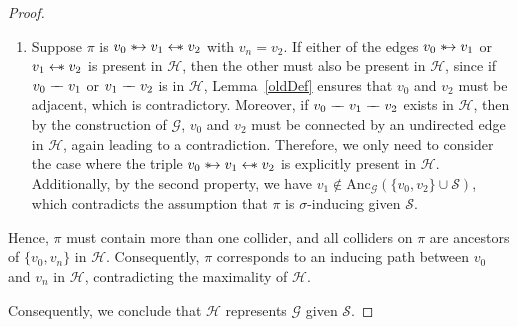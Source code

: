 \documentclass[accepted]{uai2025} %
\newcommand{\anc}{\text{Anc}}
\newcommand{\hus}{\mathrel{{\leftarrow\mkern-11mu\ast}}}
\newcommand{\suh}{\mathrel{{\ast\mkern-11mu\to}}}
\newcommand{\tut}{\mathrel{{\relbar\mkern-9mu\relbar}}}
\begin{document}
\begin{proof}
\begin{enumerate}
    \item Suppose \( \pi \) is \( v_0 \suh v_1 \hus v_2 \) with \( v_n = v_2 \). If either of the edges \( v_0 \suh v_1 \) or $v_1\hus v_2$ is present in \( \mathcal{H} \), then the other must also be present in $\mathcal{H}$, since if \( v_0 \tut v_1 \) or \( v_1 \tut v_2 \) is in \( \mathcal{H} \), Lemma~\ref{oldDef} ensures that \( v_0 \) and \( v_2 \) must be adjacent, which is contradictory. Moreover, if \( v_0 \tut v_1 \tut v_2 \) exists in \( \mathcal{H} \), then by the construction of \( \mathcal{G} \), \( v_0 \) and \( v_2 \) must be connected by an undirected edge in \( \mathcal{H} \), again leading to a contradiction. Therefore, we only need to consider the case where the triple \( v_0 \suh v_1 \hus v_2 \) is explicitly present in \( \mathcal{H} \). Additionally, by the second property, we have $v_1\notin\anc_\mathcal{G}(\{v_0,v_2\}\cup\mathcal{S})$, which contradicts the assumption that $\pi$ is $\sigma$-inducing given $\mathcal{S}$.
\end{enumerate}

Hence, $\pi$ must contain more than one collider, and all colliders on \( \pi \) are ancestors of \( \{v_0, v_n\} \) in \( \mathcal{H} \). Consequently, \( \pi \) corresponds to an inducing path between \( v_0 \) and \( v_n \) in \( \mathcal{H} \), contradicting the maximality of \( \mathcal{H} \).

Consequently, we conclude that \( \mathcal{H} \) represents \( \mathcal{G} \) given \( \mathcal{S} \).
\end{proof}
\end{document}
